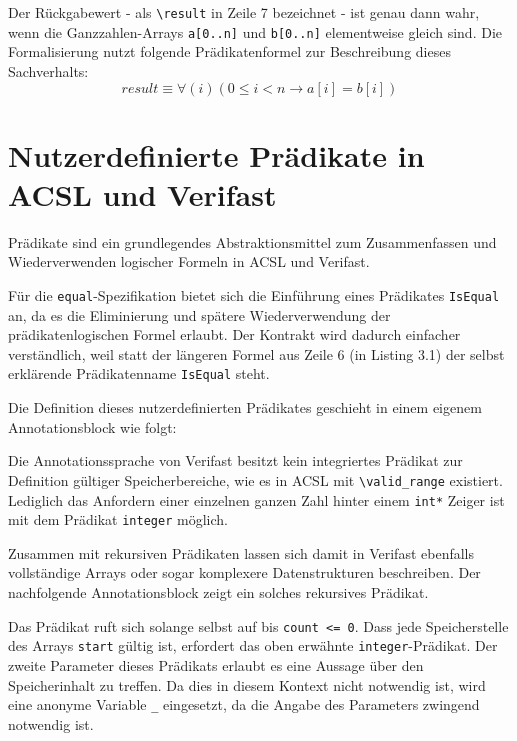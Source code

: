 Der Rückgabewert - als \lstinline{\result} in Zeile 7 bezeichnet - ist genau dann wahr, wenn die Ganzzahlen-Arrays 
\lstinline{a[0..n]} und \lstinline{b[0..n]} elementweise gleich sind. Die Formalisierung nutzt folgende
Prädikatenformel zur Beschreibung dieses Sachverhalts:
\[result \equiv \forall(i) (0 \leq i < n \rightarrow a[i] = b[i])\]

\section{Nutzerdefinierte Prädikate in ACSL und Verifast}
\label{sec:design-by-contract:predicates}

Prädikate sind ein grundlegendes Abstraktionsmittel zum Zusammenfassen und Wiederverwenden logischer
Formeln in ACSL und Verifast.

Für die \texttt{equal}-Spezifikation bietet sich die Einführung eines Prädikates \texttt{IsEqual} an,
da es die Eliminierung und spätere Wiederverwendung der prädikatenlogischen Formel erlaubt. Der Kontrakt
wird dadurch einfacher verständlich, weil statt der längeren Formel aus Zeile 6 (in Listing 3.1) der selbst erklärende
Prädikatenname \texttt{IsEqual} steht.



Die Definition dieses nutzerdefinierten Prädikates geschieht in einem eigenem Annotationsblock wie folgt:



Die Annotationssprache von Verifast besitzt kein integriertes Prädikat zur Definition gültiger Speicherbereiche,
wie es in ACSL mit \lstinline{\valid_range} existiert. Lediglich das Anfordern einer einzelnen ganzen Zahl hinter
einem \lstinline{int*} Zeiger ist mit dem Prädikat \lstinline{integer} möglich.

Zusammen mit rekursiven Prädikaten lassen sich damit in Verifast ebenfalls vollständige Arrays oder sogar komplexere
Datenstrukturen beschreiben. Der nachfolgende Annotationsblock zeigt ein solches rekursives Prädikat.



Das Prädikat ruft sich solange selbst auf bis \lstinline{count <= 0}. Dass jede Speicherstelle des Arrays \lstinline{start}
gültig ist, erfordert das oben erwähnte \lstinline{integer}-Prädikat. Der zweite Parameter dieses Prädikats erlaubt es eine
Aussage über den Speicherinhalt zu treffen. Da dies in diesem Kontext nicht notwendig ist, wird eine anonyme Variable
\lstinline{_} eingesetzt, da die Angabe des Parameters zwingend notwendig ist.

